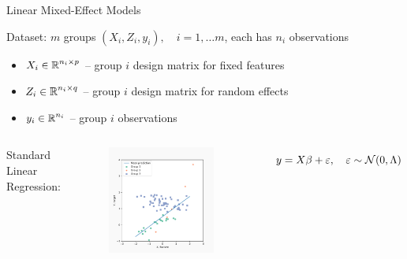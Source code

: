 \documentclass[8pt]{beamer}
\begin{document}
\begin{frame}{Linear Mixed-Effect Models}

	Dataset: $m$ groups $(X_i, Z_i, y_i),\quad i = 1, \dots m$, each has $n_i$ observations
	\begin{itemize}
		\item 	$X_i \in \operatorname{\mathbb{R}}^{n_i \times p}$ -- group $i$ design matrix for fixed features
		\item 	$Z_i \in \operatorname{\mathbb{R}}^{n_i \times q}$ -- group $i$ design matrix for random effects
		\item 	$y_i \in \operatorname{\mathbb{R}}^{n_i}$ -- group $i$ observations  
	\end{itemize}
	

	\begin{columns}[T,onlytextwidth]
	 \centering Standard Linear Regression:
   	\begin{figure}
   		\includegraphics[width=0.9\textwidth]{Figures/lme_example_mean_prediction}
   	\end{figure}
   	\[
   		y = X\beta + \varepsilon, \quad \varepsilon \sim \operatorname{\mathcal{N}}(0, \Lambda) 
   	\]


\end{columns}
\end{frame}
\end{document}
